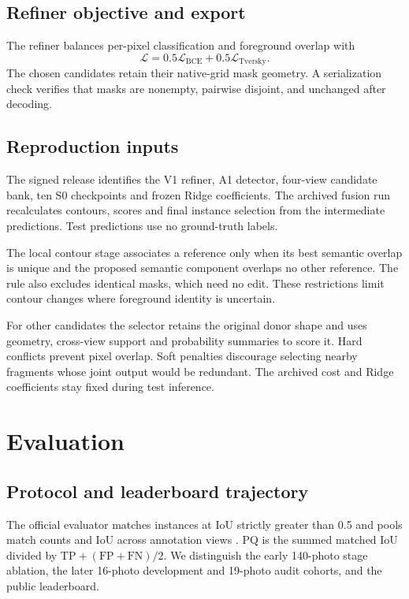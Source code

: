 \documentclass[sigconf]{acmart}
\begin{document}
\subsection{Refiner objective and export}
The refiner balances per-pixel classification and foreground overlap with
\begin{equation}
\mathcal L=0.5\mathcal L_{\mathrm{BCE}}+0.5\mathcal L_{\mathrm{Tversky}}.
\end{equation}
The chosen candidates retain their native-grid mask geometry. A serialization check verifies that masks are nonempty, pairwise disjoint, and unchanged after decoding.

\subsection{Reproduction inputs}
The signed release identifies the V1 refiner, A1 detector, four-view candidate bank, ten S0 checkpoints and frozen Ridge coefficients. The archived fusion run recalculates contours, scores and final instance selection from the intermediate predictions. Test predictions use no ground-truth labels.

The local contour stage associates a reference only when its best semantic overlap is unique and the proposed semantic component overlaps no other reference. The rule also excludes identical masks, which need no edit. These restrictions limit contour changes where foreground identity is uncertain.

For other candidates the selector retains the original donor shape and uses geometry, cross-view support and probability summaries to score it. Hard conflicts prevent pixel overlap. Soft penalties discourage selecting nearby fragments whose joint output would be redundant. The archived cost and Ridge coefficients stay fixed during test inference.

\clearpage
\section{Evaluation}\label{sec:evaluation}
\subsection{Protocol and leaderboard trajectory}
The official evaluator matches instances at IoU strictly greater than 0.5 and pools match counts and IoU across annotation views \cite{kirillov2019panoptic}. PQ is the summed matched IoU divided by $\mathrm{TP}+(\mathrm{FP}+\mathrm{FN})/2$. We distinguish the early 140-photo stage ablation, the later 16-photo development and 19-photo audit cohorts, and the public leaderboard.
\end{document}
